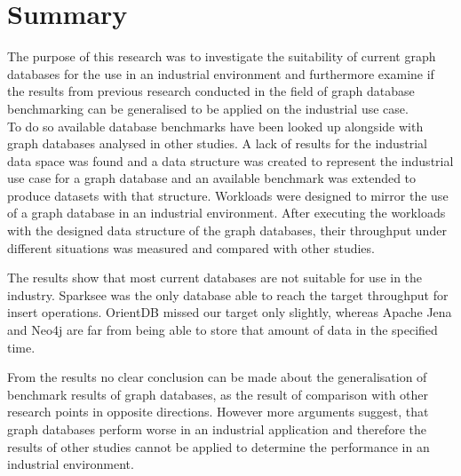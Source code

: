 \section{Summary}
The purpose of this research was to investigate the suitability of current graph databases for the use in an industrial environment and furthermore examine if the results from previous research conducted in the field of graph database benchmarking can be generalised to be applied on the industrial use case.\\
To do so available database benchmarks have been looked up alongside with graph databases analysed in other studies.
A lack of results for the industrial data space was found and a data structure was created to represent the industrial use case for a graph database and an available benchmark was extended to produce datasets with that structure.
Workloads were designed to mirror the use of a graph database in an industrial environment.
After executing the workloads with the designed data structure of the graph databases,
their throughput under different situations was measured and compared with other studies.

The results show that most current databases are not suitable for use in the industry.
Sparksee was the only database able to reach the target throughput for insert operations.
OrientDB missed our target only slightly,
whereas Apache Jena and Neo4j are far from being able to store that amount of data in the specified time.

From the results no clear conclusion can be made about the generalisation of benchmark results of graph databases,
as the result of comparison with other research points in opposite directions.
However more arguments suggest,
that graph databases perform worse in an industrial application and therefore the results of other studies cannot be applied to determine the performance in an industrial environment.
